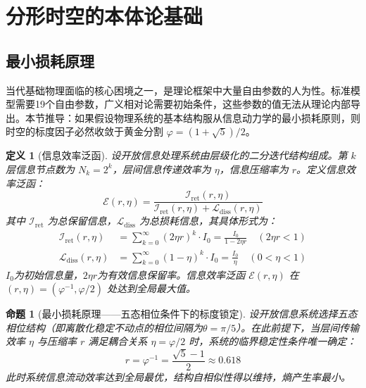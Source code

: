 \documentclass[12pt,a4paper,twocolumn]{article}
\renewcommand{\phi}{\varphi}
\newtheorem{proposition}[theorem]{命题}
\newtheorem{definition}[theorem]{定义}
\begin{document}
\section{分形时空的本体论基础}
\label{sec:ontology}

\subsection{最小损耗原理}
\label{subsec:min_loss}

当代基础物理面临的核心困境之一，是理论框架中大量自由参数的人为性。标准模型需要19个自由参数，广义相对论需要初始条件，这些参数的值无法从理论内部导出。本节推导：如果假设物理系统的基本结构服从信息动力学的最小损耗原则，则时空的标度因子必然收敛于黄金分割 $\phi = (1+\sqrt{5})/2$。

\begin{definition}[信息效率泛函]
设开放信息处理系统由层级化的二分迭代结构组成。第 $k$ 层信息节点数为 $N_k = 2^k$，层间信息传递效率为 $\eta$，信息压缩率为 $r$。定义信息效率泛函：
\begin{equation}
\mathcal{E}(r,\eta) = \frac{\mathcal{I}_{\text{ret}}(r,\eta)}{\mathcal{I}_{\text{ret}}(r,\eta) + \mathcal{L}_{\text{diss}}(r,\eta)}
\end{equation}
其中 $\mathcal{I}_{\text{ret}}$ 为总保留信息，$\mathcal{L}_{\text{diss}}$ 为总损耗信息，其具体形式为：
\begin{align}
\mathcal{I}_{\text{ret}}(r,\eta) &= \sum_{k=0}^{\infty} (2\eta r)^k \cdot I_0 = \frac{I_0}{1 - 2\eta r} \quad (2\eta r < 1) \\
\mathcal{L}_{\text{diss}}(r,\eta) &= \sum_{k=0}^{\infty} (1-\eta)^k \cdot I_0 = \frac{I_0}{\eta} \quad (0 < \eta < 1)
\end{align}
$I_0$为初始信息量，$2\eta r$为有效信息保留率。信息效率泛函 $\mathcal{E}(r,\eta)$ 在 $(r,\eta)=(\phi^{-1},\phi/2)$ 处达到全局最大值。
\end{definition}

\begin{proposition}[最小损耗原理——五态相位条件下的标度锁定]
\label{prop:min_loss}
设开放信息系统选择五态相位结构（即离散化稳定不动点的相位间隔为$\theta = \pi/5$）。在此前提下，当层间传输效率 $\eta$ 与压缩率 $r$ 满足耦合关系 $\eta = \phi/2$ 时，系统的临界稳定性条件唯一确定：
\begin{equation}
r = \phi^{-1} = \frac{\sqrt{5}-1}{2} \approx 0.618
\end{equation}
此时系统信息流动效率达到全局最优，结构自相似性得以维持，熵产生率最小。
\end{proposition}
\end{document}
